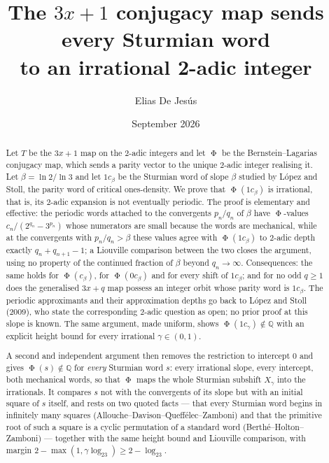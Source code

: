 \documentclass[11pt,reqno]{amsart}
\theoremstyle{plain}
\theoremstyle{definition}
\newcommand{\Q}{\mathbb{Q}}
\DeclareMathOperator{\Ph}{\Phi}
\begin{document}
\title[Every Sturmian word has irrational conjugacy value]
{The $3x+1$ conjugacy map sends every Sturmian word\\ to an irrational
2-adic integer}

\author{Elias De Jes\'us}
\address{Independent Researcher}
\date{September 2026}


\begin{abstract}
Let $T$ be the $3x+1$ map on the $2$-adic integers and let $\Ph$ be the
Bernstein--Lagarias conjugacy map, which sends a parity vector to the unique
$2$-adic integer realising it. Let $\beta=\ln 2/\ln 3$ and let $1c_\beta$ be the
Sturmian word of slope $\beta$ studied by L\'opez and Stoll, the parity word of
critical ones-density. We prove that $\Ph(1c_\beta)$ is irrational, that is, its
$2$-adic expansion is not eventually periodic. The proof is elementary and
effective: the periodic words attached to the convergents $p_n/q_n$ of $\beta$
have $\Ph$-values $c_n/(2^{q_n}-3^{p_n})$ whose numerators are small because the
words are mechanical, while at the convergents with $p_n/q_n>\beta$ these values
agree with $\Ph(1c_\beta)$ to $2$-adic depth exactly $q_n+q_{n+1}-1$; a Liouville
comparison between the two closes the argument, using no property of the
continued fraction of $\beta$ beyond $q_n\to\infty$. Consequences: the same holds
for $\Ph(c_\beta)$, for $\Ph(0c_\beta)$ and for every shift of $1c_\beta$; and for
no odd $q\ge 1$ does the generalised $3x+q$ map possess an integer orbit whose
parity word is $1c_\beta$. The periodic approximants and their approximation
depths go back to L\'opez and Stoll (2009), who state the corresponding
$2$-adic question as open; no prior proof at this slope is known. The same
argument, made uniform, shows $\Ph(1c_\gamma)\notin\Q$ with an explicit height
bound for every irrational $\gamma\in(0,1)$.

A second and independent argument then removes the restriction to intercept $0$
and gives $\Ph(s)\notin\Q$ for \emph{every} Sturmian word $s$: every irrational
slope, every intercept, both mechanical words, so that $\Ph$ maps the whole
Sturmian subshift $X_\gamma$ into the irrationals. It compares $s$ not with the
convergents of its slope but with an initial square of $s$ itself, and rests on
two quoted facts --- that every Sturmian word begins in infinitely many squares
(Allouche--Davison--Queff\'elec--Zamboni) and that the primitive root of such a
square is a cyclic permutation of a standard word
(Berth\'e--Holton--Zamboni) --- together with the same height bound and Liouville
comparison, with margin $2-\max(1,\gamma\log_23)\ge2-\log_23$.


\end{abstract}
\end{document}
